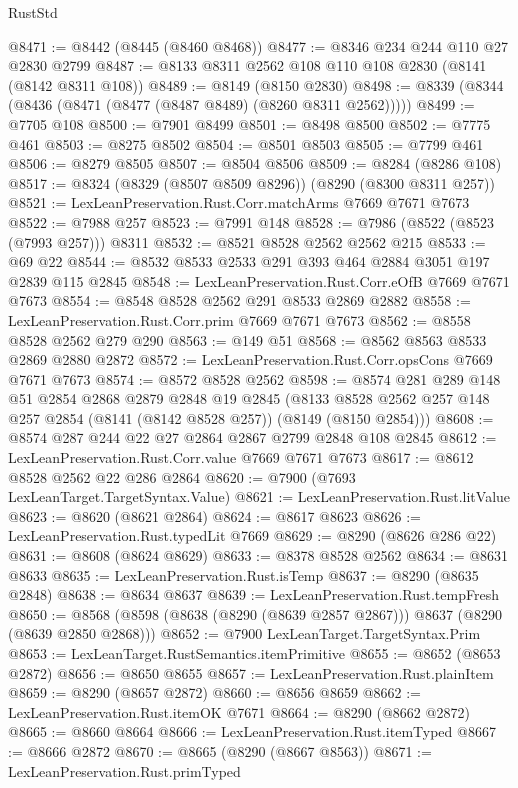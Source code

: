\begin{lexlean}{RustStd}
\begin{coremodule}
@8471 := @8442 (@8445 (@8460 @8468))
@8477 := @8346 @234 @244 @110 @27 @2830 @2799
@8487 := @8133 @8311 @2562 @108 @110 @108 @2830 (@8141 (@8142 @8311 @108))
@8489 := @8149 (@8150 @2830)
@8498 := @8339 (@8344 (@8436 (@8471 (@8477 (@8487 @8489) (@8260 @8311 @2562)))))
@8499 := @7705 @108
@8500 := @7901 @8499
@8501 := @8498 @8500
@8502 := @7775 @461
@8503 := @8275 @8502
@8504 := @8501 @8503
@8505 := @7799 @461
@8506 := @8279 @8505
@8507 := @8504 @8506
@8509 := @8284 (@8286 @108)
@8517 := @8324 (@8329 (@8507 @8509 @8296)) (@8290 (@8300 @8311 @257))
@8521 := LexLeanPreservation.Rust.Corr.matchArms @7669 @7671 @7673
@8522 := @7988 @257
@8523 := @7991 @148
@8528 := @7986 (@8522 (@8523 (@7993 @257))) @8311
@8532 := @8521 @8528 @2562 @2562 @215
@8533 := @69 @22
@8544 := @8532 @8533 @2533 @291 @393 @464 @2884 @3051 @197 @2839 @115 @2845
@8548 := LexLeanPreservation.Rust.Corr.eOfB @7669 @7671 @7673
@8554 := @8548 @8528 @2562 @291 @8533 @2869 @2882
@8558 := LexLeanPreservation.Rust.Corr.prim @7669 @7671 @7673
@8562 := @8558 @8528 @2562 @279 @290
@8563 := @149 @51
@8568 := @8562 @8563 @8533 @2869 @2880 @2872
@8572 := LexLeanPreservation.Rust.Corr.opsCons @7669 @7671 @7673
@8574 := @8572 @8528 @2562
@8598 := @8574
    @281
    @289
    @148
    @51
    @2854
    @2868
    @2879
    @2848
    @19
    @2845
    (@8133 @8528 @2562 @257 @148 @257 @2854 (@8141 (@8142 @8528 @257)) (@8149 (@8150 @2854)))
@8608 := @8574 @287 @244 @22 @27 @2864 @2867 @2799 @2848 @108 @2845
@8612 := LexLeanPreservation.Rust.Corr.value @7669 @7671 @7673
@8617 := @8612 @8528 @2562 @22 @286 @2864
@8620 := @7900 (@7693 LexLeanTarget.TargetSyntax.Value)
@8621 := LexLeanPreservation.Rust.litValue
@8623 := @8620 (@8621 @2864)
@8624 := @8617 @8623
@8626 := LexLeanPreservation.Rust.typedLit @7669
@8629 := @8290 (@8626 @286 @22)
@8631 := @8608 (@8624 @8629)
@8633 := @8378 @8528 @2562
@8634 := @8631 @8633
@8635 := LexLeanPreservation.Rust.isTemp
@8637 := @8290 (@8635 @2848)
@8638 := @8634 @8637
@8639 := LexLeanPreservation.Rust.tempFresh
@8650 := @8568 (@8598 (@8638 (@8290 (@8639 @2857 @2867))) @8637 (@8290 (@8639 @2850 @2868)))
@8652 := @7900 LexLeanTarget.TargetSyntax.Prim
@8653 := LexLeanTarget.RustSemantics.itemPrimitive
@8655 := @8652 (@8653 @2872)
@8656 := @8650 @8655
@8657 := LexLeanPreservation.Rust.plainItem
@8659 := @8290 (@8657 @2872)
@8660 := @8656 @8659
@8662 := LexLeanPreservation.Rust.itemOK @7671
@8664 := @8290 (@8662 @2872)
@8665 := @8660 @8664
@8666 := LexLeanPreservation.Rust.itemTyped
@8667 := @8666 @2872
@8670 := @8665 (@8290 (@8667 @8563))
@8671 := LexLeanPreservation.Rust.primTyped

\end{coremodule}
\end{lexlean}
